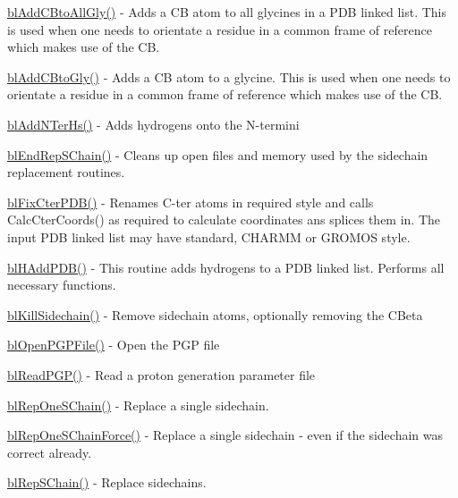 \begin{DoxyItemize}
\item \hyperlink{_gly_c_b_8c_a7b43af52eac87cfb119df424f5decf09}{bl\-Add\-C\-Bto\-All\-Gly()} -\/ Adds a C\-B atom to all glycines in a P\-D\-B linked list. This is used when one needs to orientate a residue in a common frame of reference which makes use of the C\-B.
\item \hyperlink{_gly_c_b_8c_a28b7203795311090e0943b009e73d02f}{bl\-Add\-C\-Bto\-Gly()} -\/ Adds a C\-B atom to a glycine. This is used when one needs to orientate a residue in a common frame of reference which makes use of the C\-B.
\item \hyperlink{_add_n_ter_hs_8c_ad8723c1844a4ac8e92bf2282e3fd871d}{bl\-Add\-N\-Ter\-Hs()} -\/ Adds hydrogens onto the N-\/termini
\item \hyperlink{pdb_8h_ae04f2604d73e1c2574f8fb5e461cf0cb}{bl\-End\-Rep\-S\-Chain()} -\/ Cleans up open files and memory used by the sidechain replacement routines.
\item \hyperlink{_fix_cter_p_d_b_8c_a4f1d9e2e442f9b23a3673832737041b6}{bl\-Fix\-Cter\-P\-D\-B()} -\/ Renames C-\/ter atoms in required style and calls Calc\-Cter\-Coords() as required to calculate coordinates ans splices them in. The input P\-D\-B linked list may have standard, C\-H\-A\-R\-M\-M or G\-R\-O\-M\-O\-S style.
\item \hyperlink{_h_add_p_d_b_8c_adb102327d8ccb3318e08d1cfc853e687}{bl\-H\-Add\-P\-D\-B()} -\/ This routine adds hydrogens to a P\-D\-B linked list. Performs all necessary functions.
\item \hyperlink{_kill_sidechain_8c_a5e86b571e603a0d4d0a8850f8db6f195}{bl\-Kill\-Sidechain()} -\/ Remove sidechain atoms, optionally removing the C\-Beta
\item \hyperlink{_h_add_p_d_b_8c_a57f9337f4b73c4461b9d5a8cb46a9f72}{bl\-Open\-P\-G\-P\-File()} -\/ Open the P\-G\-P file
\item \hyperlink{_h_add_p_d_b_8c_abee3ca151f4112a486c688d6ef4293e8}{bl\-Read\-P\-G\-P()} -\/ Read a proton generation parameter file
\item \hyperlink{pdb_8h_af900f21c1a37ba63496962ab1ffec576}{bl\-Rep\-One\-S\-Chain()} -\/ Replace a single sidechain.
\item \hyperlink{pdb_8h_a69e7e47bf272bd9f3f3f46443071dfb0}{bl\-Rep\-One\-S\-Chain\-Force()} -\/ Replace a single sidechain -\/ even if the sidechain was correct already.
\item \hyperlink{pdb_8h_a50cfdbb56896226d5eac2dd5438dbc13}{bl\-Rep\-S\-Chain()} -\/ Replace sidechains.

\end{DoxyItemize}
